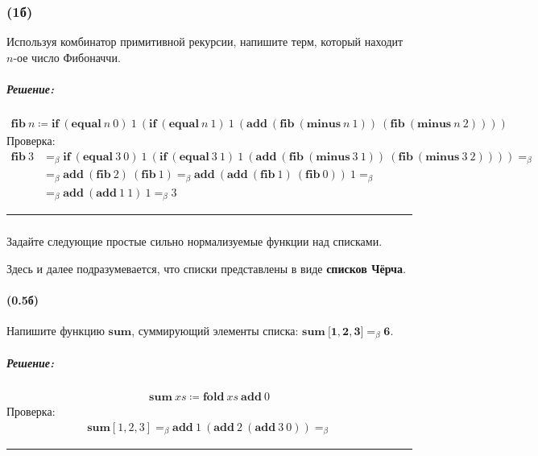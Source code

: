 \documentclass{article}
\newenvironment{proof}{\subparagraph{\hspace{-1em}Решение:\newline}\-}{\par\noindent\rule{\textwidth}{0.4pt}}
\newcommand{\term}[1]{\mathbf{#1}}
\newcommand{\ap}{~}
\newcommand{\eqbeta}{=_\beta}
\newcommand{\tlist}[1]{\term{[}#1\term{]}} %
\begin{document}
    \subsubsection{(1б)}

    Используя комбинатор примитивной рекурсии, напишите терм, который
    находит $n$-ое число Фибоначчи.

    \begin{proof}
        \begin{gather}
            \term{fib}~n \coloneqq \term{if}~(\term{equal}~n~0)~1~(\term{if}~(\term{equal}~n~1)~1~(\term{add}~(\term{fib}~(\term{minus}~n~1))~(\term{fib}~(\term{minus}~n~2))))
        \end{gather}
        Проверка:
        \begin{align}
            \term{fib}~3 & \eqbeta \term{if}~(\term{equal}~3~0)~1~(\term{if}~(\term{equal}~3~1)~1~(\term{add}~(\term{fib}~(\term{minus}~3~1))~(\term{fib}~(\term{minus}~3~2)))) \eqbeta \\
                         & \eqbeta \term{add}~(\term{fib}~2)~(\term{fib}~1) \eqbeta \term{add}~(\term{add}~(\term{fib}~1)~(\term{fib}~0))~1 \eqbeta \\
                         & \eqbeta \term{add}~(\term{add}~1~1)~1 \eqbeta 3
        \end{align}
    \end{proof}

    \subsubsection{}

    Задайте следующие простые сильно нормализуемые функции над списками.

    Здесь и далее подразумевается, что списки представлены в виде \textbf{списков Чёрча}.

    \paragraph{(0.5б)}

    Напишите функцию $\term{sum}$, суммирующий элементы списка: $\term{sum} \ap \tlist{\term{1}, \term{2}, \term{3}} \eqbeta \term{6}$.

    \begin{proof}
        \begin{gather}
            \term{sum}~xs \coloneqq \term{fold}~xs~\term{add}~0
        \end{gather}
        Проверка:
        \begin{align}
            \term{sum} [1, 2, 3] \eqbeta \term{add}~1~(\term{add}~2~(\term{add}~3~0)) \eqbeta
        \end{align}
    \end{proof}
\end{document}
